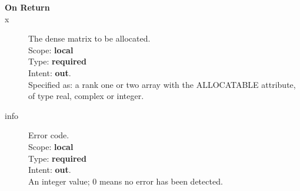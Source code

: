 \begin{description}
\item[\bf On Return]
\item[x] The dense matrix to be allocated.\\
Scope: {\bf local} \\
Type: {\bf required}\\
Intent: {\bf out}.\\
Specified as: a rank one or two array with the ALLOCATABLE
attribute, of type real, complex or integer.\\
\item[info] Error code.\\
Scope: {\bf local} \\
Type: {\bf required} \\
Intent: {\bf out}.\\
An integer value; 0 means no error has been detected. 
\end{description}


%
%


